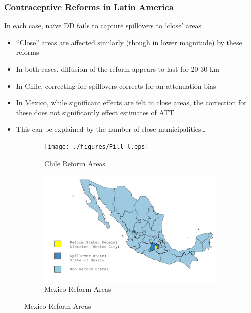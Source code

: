 \documentclass[10pt,letterpaper,subeqn]{beamer}
\begin{document}
\begin{frame}[label=empirB2]

\end{frame}

\begin{frame}[label=empirB3]
 \frametitle{Contraceptive Reforms in Latin America}
In each case, na\"ive DD fails to capture spillovers to `close' areas
\vspace{8mm}
\begin{itemize}
\item ``Close'' areas are affected similarly (though in lower magnitude) by these reforms
\item In both cases, diffusion of the reform appears to last for 20-30 km
\item In Chile, correcting for spillovers corrects for an attenuation bias
\item In Mexico, while significant effects are felt in close areas, the correction for
these does not significantly effect estimates of ATT
\item This can be explained by the number of close municipalities\ldots
\end{itemize}
\end{frame}



\begin{frame}[label=MexMap]
\begin{figure}
\centering
\begin{subfigure}{.5\textwidth}
  \centering
  \texttt{[image: ./figures/Pill\_l.eps]}
  \caption{Chile Reform Areas}
  \label{fig:sub1}
\end{subfigure}%
\begin{subfigure}{.5\textwidth}
  \centering
  \vspace{2.2cm}
  \includegraphics[scale=0.16]{./figures/MexReform.png}
  \vspace{2.2cm}
  \caption{Mexico Reform Areas}
  \label{fig:sub2}
\end{subfigure}
\end{figure}
\end{frame}
\end{document}
